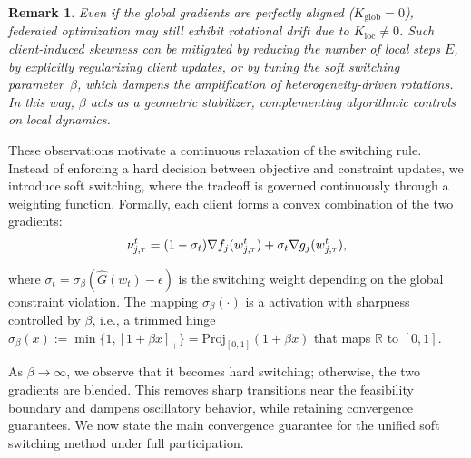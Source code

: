 \documentclass{article} %
\newtheorem{remark}{Remark}[]
\begin{document}
\begin{remark} \label{rmk:local_skewness}
Even if the global gradients are perfectly aligned ($K_{\text{glob}}=0$), federated optimization may still exhibit rotational drift due to $K_{\text{loc}} \neq 0$. Such client-induced skewness can be mitigated by reducing the number of local steps $E$, by explicitly regularizing client updates, or by tuning the soft switching parameter~$\beta$, which dampens the amplification of heterogeneity-driven rotations. In this way, $\beta$ acts as a geometric stabilizer, complementing algorithmic controls on local dynamics.
\end{remark}

These observations motivate a continuous relaxation of the switching rule. Instead of enforcing a hard decision between objective and constraint updates, we introduce {soft switching}, where the tradeoff is governed continuously through a weighting function. Formally, each client forms a convex combination of the two gradients:
$$\nu_{j,\tau}^t = (1-\sigma_t) \nabla f_j(w_{j,\tau}^t) + \sigma_t\nabla g_j(w_{j,\tau}^t),\vspace{-3mm}$$ 

where $\sigma_t = \sigma_\beta(\hat{G}(w_t) - \epsilon) $ is the switching weight depending on the global constraint violation. 
The mapping $\sigma_\beta(\cdot)$ is a activation with sharpness controlled by $\beta$, i.e., a trimmed hinge $\sigma_\beta(x) := \min\{1, [1+\beta x]_+\} = \text{Proj}_{[0,1]}(1+\beta x)$ that maps $\mathbb{R}$ to $[0,1]$.

As $\beta \to \infty$, we observe that it becomes hard switching; otherwise, the two gradients are blended. This removes sharp transitions near the feasibility boundary and dampens oscillatory behavior, while retaining convergence guarantees. We now state the main convergence guarantee for the unified soft switching method under full participation.
\end{document}
